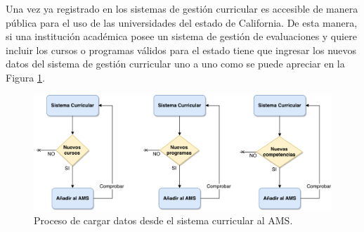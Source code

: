 Una vez ya registrado en los sistemas de gestión curricular es accesible de manera pública para el uso de las universidades del estado de California. De esta manera, si una institución académica posee un sistema de gestión de evaluaciones y quiere incluir los cursos o programas válidos para el estado tiene que ingresar los nuevos datos del sistema de gestión curricular uno a uno como se puede apreciar en la Figura \ref{after_creation}.

\begin{figure}[]
\centering
\includegraphics[width=125mm,scale=1]{img/after_creation}
\caption{Proceso de cargar datos desde el sistema curricular al AMS.}
  \label{after_creation}
\end{figure}